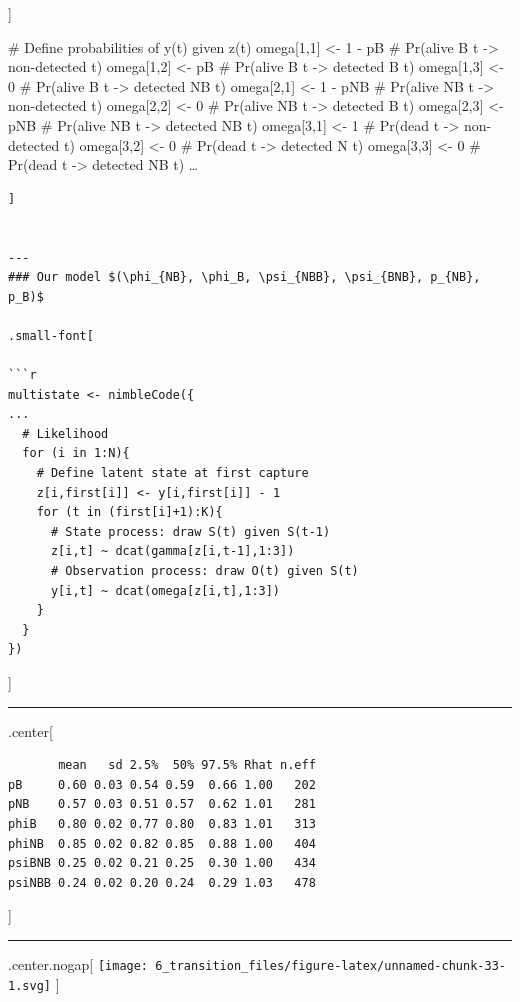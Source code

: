 \documentclass[
]{article}
\begin{document}
{]}

\# Define probabilities of y(t) given z(t) omega{[}1,1{]} \textless- 1 -
pB \# Pr(alive B t -\textgreater{} non-detected t) omega{[}1,2{]}
\textless- pB \# Pr(alive B t -\textgreater{} detected B t)
omega{[}1,3{]} \textless- 0 \# Pr(alive B t -\textgreater{} detected NB
t) omega{[}2,1{]} \textless- 1 - pNB \# Pr(alive NB t -\textgreater{}
non-detected t) omega{[}2,2{]} \textless- 0 \# Pr(alive NB t
-\textgreater{} detected B t) omega{[}2,3{]} \textless- pNB \# Pr(alive
NB t -\textgreater{} detected NB t) omega{[}3,1{]} \textless- 1 \#
Pr(dead t -\textgreater{} non-detected t) omega{[}3,2{]} \textless- 0 \#
Pr(dead t -\textgreater{} detected N t) omega{[}3,3{]} \textless- 0 \#
Pr(dead t -\textgreater{} detected NB t) \ldots{}

\begin{verbatim}
]


---
### Our model $(\phi_{NB}, \phi_B, \psi_{NBB}, \psi_{BNB}, p_{NB}, p_B)$

.small-font[

```r
multistate <- nimbleCode({
...
  # Likelihood 
  for (i in 1:N){
    # Define latent state at first capture
    z[i,first[i]] <- y[i,first[i]] - 1
    for (t in (first[i]+1):K){
      # State process: draw S(t) given S(t-1)
      z[i,t] ~ dcat(gamma[z[i,t-1],1:3])
      # Observation process: draw O(t) given S(t)
      y[i,t] ~ dcat(omega[z[i,t],1:3])
    }
  }
})
\end{verbatim}

{]}

\begin{center}\rule{0.5\linewidth}{0.5pt}\end{center}

.center{[}

\begin{verbatim}
       mean   sd 2.5%  50% 97.5% Rhat n.eff
pB     0.60 0.03 0.54 0.59  0.66 1.00   202
pNB    0.57 0.03 0.51 0.57  0.62 1.01   281
phiB   0.80 0.02 0.77 0.80  0.83 1.01   313
phiNB  0.85 0.02 0.82 0.85  0.88 1.00   404
psiBNB 0.25 0.02 0.21 0.25  0.30 1.00   434
psiNBB 0.24 0.02 0.20 0.24  0.29 1.03   478
\end{verbatim}

{]}

\begin{center}\rule{0.5\linewidth}{0.5pt}\end{center}

.center.nogap{[}
\texttt{[image: 6\_transition\_files/figure-latex/unnamed-chunk-33-1.svg]}
{]}
\end{document}
